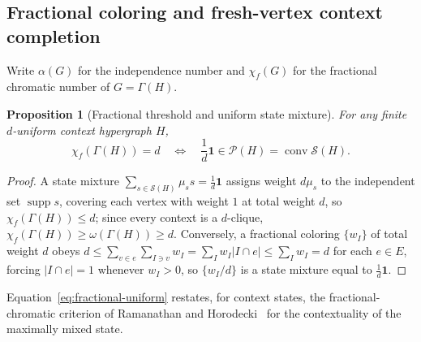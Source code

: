 \documentclass[aps,pra,reprint,superscriptaddress,longbibliography,nofootinbib,floatfix,10pt]{revtex4-2}
\newtheorem{proposition}[theorem]{Proposition}
\theoremstyle{definition}\newtheorem{definition}[theorem]{Definition}
\theoremstyle{remark}\newtheorem{remark}[theorem]{Remark}
\newcommand{\Sc}{\mathcal S}\newcommand{\Cc}{\mathcal C}
\DeclareMathOperator{\supp}{supp}\DeclareMathOperator{\conv}{conv}
\begin{document}
\subsection{Fractional coloring and fresh-vertex context completion}

Write $\alpha(G)$ for the independence number and $\chi_f(G)$ for the fractional chromatic number of $G=\Gamma(H)$.

\begin{proposition}[Fractional threshold and uniform state mixture]\label{prop:fractional-uniform}
For any finite $d$-uniform context hypergraph $H$,
\begin{equation}\label{eq:fractional-uniform}
\chi_f(\Gamma(H))=d \quad\Longleftrightarrow\quad \frac1d\mathbf 1\in\mathcal P(H)=\conv\Sc(H).
\end{equation}
\end{proposition}
\begin{proof}
A state mixture $\sum_{s\in\Sc(H)}\mu_s s=\frac1d\mathbf 1$ assigns weight $d\mu_s$ to the independent set $\supp s$, covering each vertex with weight $1$ at total weight $d$, so $\chi_f(\Gamma(H))\le d$; since every context is a $d$-clique, $\chi_f(\Gamma(H))\ge\omega(\Gamma(H))\ge d$. Conversely, a fractional coloring $\{w_I\}$ of total weight $d$ obeys $d\le\sum_{v\in e}\sum_{I\ni v}w_I=\sum_I w_I|I\cap e|\le\sum_I w_I=d$ for each $e\in E$, forcing $|I\cap e|=1$ whenever $w_I>0$, so $\{w_I/d\}$ is a state mixture equal to $\frac1d\mathbf 1$.
\end{proof}

Equation~\eqref{eq:fractional-uniform} restates, for context states, the fractional-chromatic criterion of Ramanathan and Horodecki~\cite{ramanathan2014sic} for the contextuality of the maximally mixed state.
\end{document}
